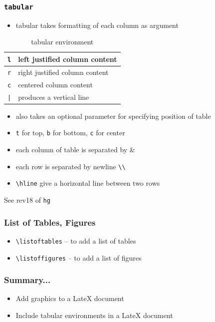 \documentclass{beamer}
\newcommand{\typ}[1]{\lstinline{#1}}
\begin{document}
\begin{frame}[fragile]
  \frametitle{\lstinline+tabular+}
  \begin{itemize}
  \item tabular takes formatting of each column as argument
  \end{itemize}

  \begin{table}
    \caption{tabular environment}
    
    \begin{tabular}{|l|l|}
      \lstinline+l+ & left justified column content\\\hline
      \lstinline+r+ & right justified column content\\\hline
      \lstinline+c+ & centered column content\\\hline
      \lstinline+|+ & produces a vertical line\\
    \end{tabular}
  \end{table}
  \begin{itemize}
  \item also takes an optional parameter for specifying position of
    table 
  \item \lstinline+t+ for top, \lstinline+b+ for bottom, \lstinline+c+
    for center 
  \item each column of table is separated by \&
  \item each row is separated by newline \lstinline{\\}
  \item \lstinline+\hline+ give a horizontal line between two rows
  \end{itemize}
  \tiny See rev18 of \typ{hg}
\end{frame}

\begin{frame}[fragile]
  \frametitle{List of Tables, Figures}
  \begin{itemize}
  \item \lstinline+\listoftables+ -- to add a list of tables
  \item \lstinline+\listoffigures+ -- to add a list of figures
  \end{itemize}
\end{frame}

\begin{frame}[fragile]
	\frametitle{Summary...}
	\begin{itemize}
	\item Add graphics to a LateX document
	\item Include tabular environments in a LateX document
	\end{itemize}
\end{frame}
\end{document}
